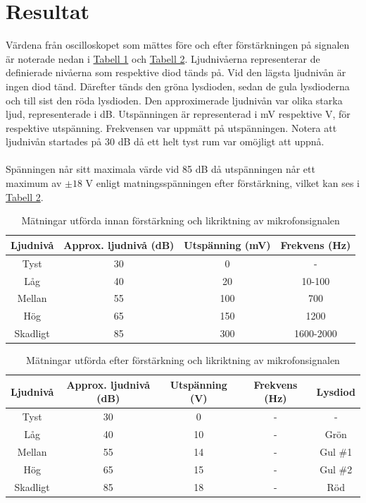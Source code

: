 \documentclass[12pt]{report}
\begin{document}
\chapter{Resultat}
\label{chap:res}
Värdena från oscilloskopet som mättes före och efter förstärkningen på signalen är
noterade nedan i \hyperref[tab:res1]{Tabell 1} och \hyperref[tab:res2]{Tabell 2}. Ljudnivåerna representerar de definierade nivåerna som respektive diod tänds på. Vid den lägsta ljudnivån är ingen diod tänd. Därefter tänds den gröna lysdioden, sedan de gula lysdioderna och till sist den röda lysdioden. Den approximerade ljudnivån var olika starka ljud, representerade i dB. Utspänningen är representerad i mV respektive V, för respektive utspänning. Frekvensen var uppmätt på utspänningen. Notera att ljudnivån startades på 30 dB då ett helt tyst rum var omöjligt att uppnå. 
\\\\
Spänningen når sitt maximala värde vid 85 dB då utspänningen når ett maximum av $\pm18$ V enligt matningsspänningen efter förstärkning, vilket kan ses i \hyperref[tab:res2]{Tabell 2}.


\begin{table}[h]
  \caption{Mätningar utförda innan förstärkning och likriktning av mikrofonsignalen}
  \centering
  \label{tab:res1}
  \begin{tabular}{|c|c|c|c|}
    \hline
    Ljudnivå & Approx. ljudnivå (dB) & Utspänning (mV) & Frekvens (Hz) \\
    \hline
    Tyst & 30 & 0 & - \\
    \hline
    Låg & 40 & 20 & 10-100 \\
    \hline
    Mellan & 55 & 100 & 700 \\
    \hline
    Hög & 65 & 150 & 1200 \\
    \hline
    Skadligt & 85 & 300 & 1600-2000 \\
    \hline
  \end{tabular}
\end{table}

\begin{table}[h]
  \caption{Mätningar utförda efter förstärkning och likriktning av mikrofonsignalen}
  \centering
  \label{tab:res2}
  \begin{tabular}{|c|c|c|c|c|}
    \hline
    Ljudnivå & Approx. ljudnivå (dB) & Utspänning (V) & Frekvens (Hz) & Lysdiod \\
    \hline
    Tyst & 30 & 0 & - & - \\
    \hline
    Låg & 40 & 10 & - & Grön \\
    \hline
    Mellan & 55 & 14 & - & Gul \#1 \\
    \hline
    Hög & 65 & 15 & - & Gul \#2 \\
    \hline
    Skadligt & 85 & 18 & - & Röd \\
    \hline
  \end{tabular}
\end{table}
\end{document}
